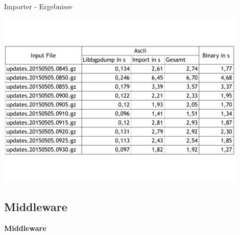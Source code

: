 \documentclass[9pt]{beamer}
\begin{document}
\begin{frame}{Importer - Ergebnisse}{}
	\begin{center}
		\includegraphics[width=0.9\textwidth]{res/vergleich.pdf}
	\end{center}
\end{frame}

\subsection{Middleware}

	\begin{frame}{}
		\begin{center}
			\LARGE \textbf{Middleware}
		\end{center}
	\end{frame}
\end{document}
